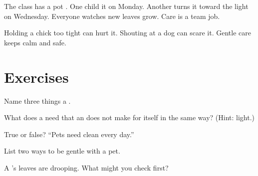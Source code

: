 \begin{example}\label{ex:g1:caring:class}
The class has a pot . One child  it on Monday. Another
turns it toward the light on Wednesday. Everyone watches new leaves
grow. Care is a team job.
\end{example}

\begin{example}\label{ex:g1:caring:kind}
Holding a chick too tight can hurt it. Shouting at a dog can scare
it. Gentle care keeps  calm and safe.
\end{example}

\section{Exercises}

\begin{exercise}[$\star$]\label{exo:g1:caring:1}
Name three things a  .
\end{exercise}

\begin{exercise}[$\star$]\label{exo:g1:caring:2}
What does a  need that an  does not make for itself in
the same way? (Hint: light.)
\end{exercise}

\begin{exercise}[$\star$]\label{exo:g1:caring:3}
True or false? ``Pets need clean  every day.''
\end{exercise}

\begin{exercise}[$\star$]\label{exo:g1:caring:4}
List two ways to be gentle with a pet.
\end{exercise}

\begin{exercise}[$\star\star$]\label{exo:g1:caring:5}
A 's leaves are drooping. What might you check first?
\end{exercise}

